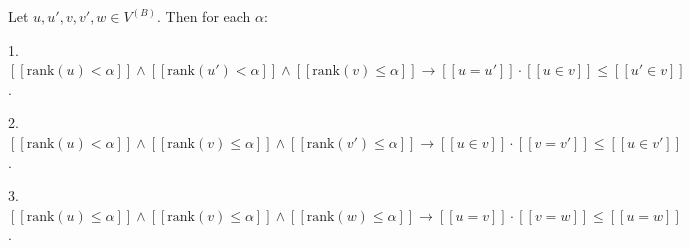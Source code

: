 Let $u, u', v, v', w \in V^{(B)}$. Then for each $\alpha$:

1. $[\![\text{rank}(u) < \alpha]\!] \land [\![\text{rank}(u') < \alpha]\!] \land [\![\text{rank}(v) \leq \alpha]\!] \rightarrow [\![u = u']\!] \cdot [\![u \in v]\!] \leq [\![u' \in v]\!]$.

2. $[\![\text{rank}(u) < \alpha]\!] \land [\![\text{rank}(v) \leq \alpha]\!] \land [\![\text{rank}(v') \leq \alpha]\!] \rightarrow [\![u \in v]\!] \cdot [\![v = v']\!] \leq [\![u \in v']\!]$.

3. $[\![\text{rank}(u) \leq \alpha]\!] \land [\![\text{rank}(v) \leq \alpha]\!] \land [\![\text{rank}(w) \leq \alpha]\!] \rightarrow [\![u = v]\!] \cdot [\![v = w]\!] \leq [\![u = w]\!]$.
